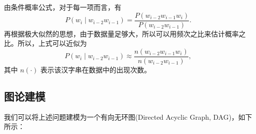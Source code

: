 \documentclass[UTF8]{ctexart}
\begin{document}
由条件概率公式，对于每一项而言，有
\begin{equation*}
    P(w_i \mid  w_{i-2}w_{i-1}) = \dfrac{P(w_{i-2}w_{i-1}w_i)}{P(w_{i-2}w_{i-1})}.
\end{equation*}
再根据极大似然的思想，由于数据量足够大，所以可以用频次之比来估计概率之比。所以，上式可以近似为
\begin{equation*}
    P(w_i \mid  w_{i-2}w_{i-1}) \approx \dfrac{n(w_{i-2}w_{i-1}w_i)}{n(w_{i-2}w_{i-1})},
\end{equation*}
其中 $n(\cdot)$ 表示该汉字串在数据中的出现次数。

\subsection{图论建模}

我们可以将上述问题建模为一个有向无环图(Directed Acyclic Graph, DAG)，如下所示：
\end{document}

